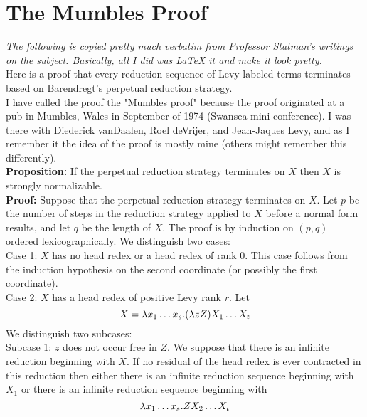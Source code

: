 \chapter{The Mumbles Proof}
\lhead{\today}
\textit{The following is copied pretty much verbatim from Professor Statman's writings on the subject. Basically, all I did was \LaTeX{} it and make it look pretty.}\\

     Here is a proof that every reduction sequence of Levy labeled terms terminates based on Barendregt's perpetual reduction strategy.\\

     I have called the proof the "Mumbles proof" because the proof originated at a pub in Mumbles, Wales in September of 1974 (Swansea mini-conference). I was there with Diederick vanDaalen, Roel deVrijer, and Jean-Jaques Levy, and as I remember it the idea of the proof is mostly mine (others might remember this differently).\\

\textbf{Proposition:} If the perpetual reduction strategy terminates on $X$ then $X$ is strongly normalizable.\\

\textbf{Proof:} Suppose that the perpetual reduction strategy terminates on $X$. Let $p$ be the number of steps in the reduction strategy applied to $X$ before a normal form results, and let $q$ be the length of $X$. The proof is by induction on $(p,q)$ ordered lexicographically. We distinguish two cases:\\

\uline{Case 1:} $X$ has no head redex or a head redex of rank $0$. This case follows from the induction hypothesis on the second coordinate (or possibly the first coordinate).\\

\uline{Case 2:} $X$ has a head redex of positive Levy rank $r$. Let
\begin{equation*}
  X = \lambda x_{1} \ldots x_{s}. (\lambda zZ)X_{1} \ldots X_{t}
\end{equation*}
We distinguish two subcases:\\

\uline{Subcase 1:} $z$ does not occur free in $Z$.  We suppose that there is an infinite reduction beginning with $X$. If no residual of the head redex is ever contracted in this reduction then either there is an infinite reduction sequence beginning with $X_{1}$ or there is an infinite reduction sequence beginning with
\begin{equation*}
  \lambda x_{1} \ldots x_{s}. Z X_{2} \ldots X_{t}
\end{equation*}


